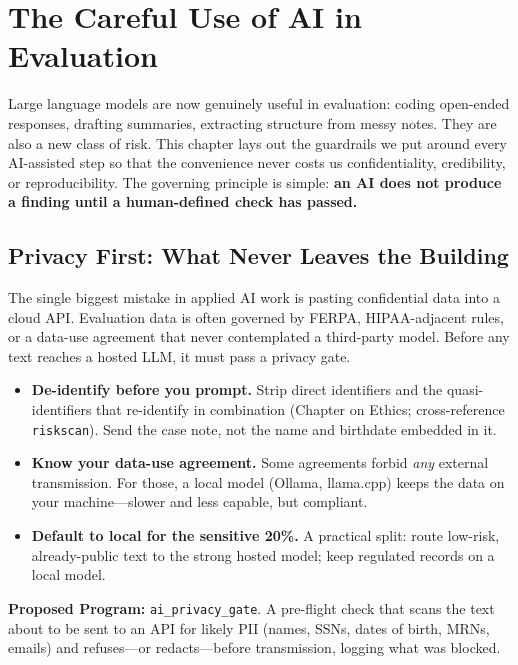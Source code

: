 \documentclass[
    a4paper,
    fontsize=10pt,
    twoside=true,
    numbers=noenddot,
]{kaobook}
\begin{document}
\chapter{The Careful Use of AI in Evaluation}\label{chap:ai-governance}
Large language models are now genuinely useful in evaluation: coding open-ended responses, drafting summaries, extracting structure from messy notes. They are also a new class of risk. This chapter lays out the guardrails we put around every AI-assisted step so that the convenience never costs us confidentiality, credibility, or reproducibility. The governing principle is simple: \textbf{an AI does not produce a finding until a human-defined check has passed.}

\section{Privacy First: What Never Leaves the Building}
The single biggest mistake in applied AI work is pasting confidential data into a cloud API. Evaluation data is often governed by FERPA, HIPAA-adjacent rules, or a data-use agreement that never contemplated a third-party model. Before any text reaches a hosted LLM, it must pass a privacy gate.
\begin{itemize}
    \item \textbf{De-identify before you prompt.} Strip direct identifiers and the quasi-identifiers that re-identify in combination (Chapter on Ethics; cross-reference \texttt{riskscan}). Send the case note, not the name and birthdate embedded in it.
    \item \textbf{Know your data-use agreement.} Some agreements forbid \emph{any} external transmission. For those, a local model (Ollama, llama.cpp) keeps the data on your machine---slower and less capable, but compliant.
    \item \textbf{Default to local for the sensitive 20\%.} A practical split: route low-risk, already-public text to the strong hosted model; keep regulated records on a local model.
\end{itemize}

\begin{kaobox}[frametitle=Ado-file Idea: \texttt{ai\_privacy\_gate}]
\textbf{Proposed Program:} \texttt{ai\_privacy\_gate}. A pre-flight check that scans the text about to be sent to an API for likely PII (names, SSNs, dates of birth, MRNs, emails) and refuses---or redacts---before transmission, logging what was blocked.
\end{kaobox}
\end{document}
